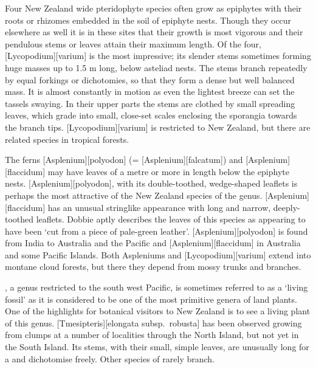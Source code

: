Four New Zealand wide pteridophyte species often grow as epiphytes with their roots or rhizomes embedded in the soil of epiphyte nests.
Though they occur elsewhere as well it is in these sites that their growth is most vigorous and their pendulous stems or leaves attain their maximum length.
Of the four, [Lycopodium][varium] is the most impressive; its slender stems sometimes forming huge masses up to 1.5 m long, below asteliad nests.
The stems branch repeatedly by equal forkings or dichotomies, so that they form a dense but well balanced mass.
It is almost constantly in motion as even the lightest breeze can set the tassels swaying.
In their upper parts the stems are clothed by small spreading leaves, which grade into small, close-set scales enclosing the sporangia towards the branch tips. [Lycopodium][varium] is restricted to New Zealand, but there are related species in tropical forests.

The ferns [Asplenium][polyodon] (= [Asplenium][falcatum]) and [Asplenium][flaccidum] may have leaves of a metre or more in length below the epiphyte nests. [Asplenium][polyodon], with its double-toothed, wedge-shaped leaflets is perhaps the most attractive of the New Zealand species of the genus. [Asplenium][flaccidum] has an unusual stringlike appearance with long and narrow, deeply-toothed leaflets.
Dobbie aptly describes the leaves of this species as appearing to have been `cut from a piece of pale-green leather'. [Asplenium][polyodon] is found from India to Australia and the Pacific and [Asplenium][flaccidum] in Australia and some Pacific Islands.
Both Aspleniums and [Lycopodium][varium] extend into montane cloud forests, but there they depend from mossy trunks and branches.

, a genus restricted to the south west Pacific, is sometimes referred to as a `living fossil' as it is considered to be one of the most primitive genera of land plants.
One of the highlights for botanical visitors to New Zealand is to see a living plant of this genus. [Tmesipteris][elongata subsp.\ robusta] has been observed growing from  clumps at a number of localities through the North Island, but not yet in the South Island.
Its stems, with their small, simple leaves, are unusually long for a  and dichotomise freely.
Other species of  rarely branch.

